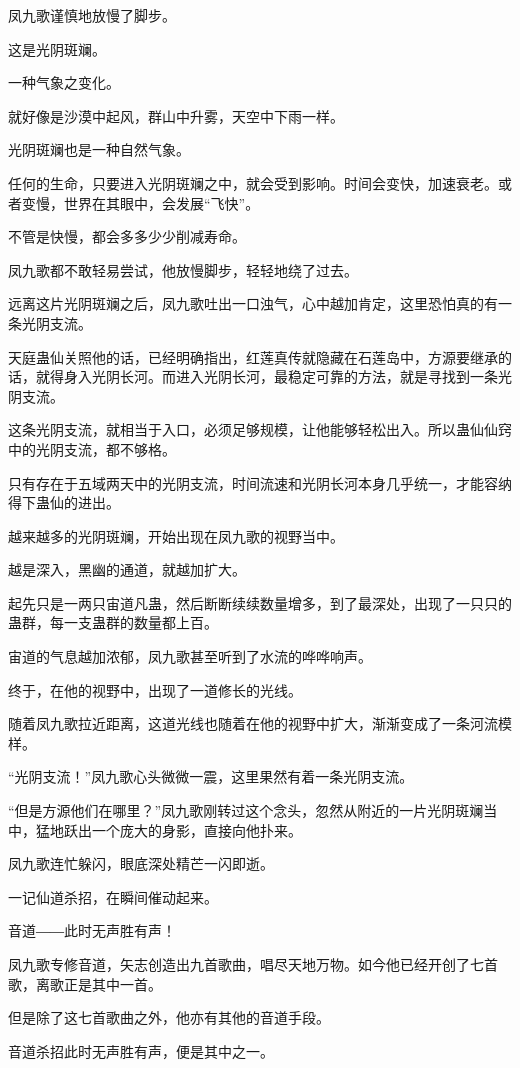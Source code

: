 \begin{this_body}
凤九歌谨慎地放慢了脚步。

这是光阴斑斓。

一种气象之变化。

就好像是沙漠中起风，群山中升雾，天空中下雨一样。

光阴斑斓也是一种自然气象。

任何的生命，只要进入光阴斑斓之中，就会受到影响。时间会变快，加速衰老。或者变慢，世界在其眼中，会发展“飞快”。

不管是快慢，都会多多少少削减寿命。

凤九歌都不敢轻易尝试，他放慢脚步，轻轻地绕了过去。

远离这片光阴斑斓之后，凤九歌吐出一口浊气，心中越加肯定，这里恐怕真的有一条光阴支流。

天庭蛊仙关照他的话，已经明确指出，红莲真传就隐藏在石莲岛中，方源要继承的话，就得身入光阴长河。而进入光阴长河，最稳定可靠的方法，就是寻找到一条光阴支流。

这条光阴支流，就相当于入口，必须足够规模，让他能够轻松出入。所以蛊仙仙窍中的光阴支流，都不够格。

只有存在于五域两天中的光阴支流，时间流速和光阴长河本身几乎统一，才能容纳得下蛊仙的进出。

越来越多的光阴斑斓，开始出现在凤九歌的视野当中。

越是深入，黑幽的通道，就越加扩大。

起先只是一两只宙道凡蛊，然后断断续续数量增多，到了最深处，出现了一只只的蛊群，每一支蛊群的数量都上百。

宙道的气息越加浓郁，凤九歌甚至听到了水流的哗哗响声。

终于，在他的视野中，出现了一道修长的光线。

随着凤九歌拉近距离，这道光线也随着在他的视野中扩大，渐渐变成了一条河流模样。

“光阴支流！”凤九歌心头微微一震，这里果然有着一条光阴支流。

“但是方源他们在哪里？”凤九歌刚转过这个念头，忽然从附近的一片光阴斑斓当中，猛地跃出一个庞大的身影，直接向他扑来。

凤九歌连忙躲闪，眼底深处精芒一闪即逝。

一记仙道杀招，在瞬间催动起来。

音道――此时无声胜有声！

凤九歌专修音道，矢志创造出九首歌曲，唱尽天地万物。如今他已经开创了七首歌，离歌正是其中一首。

但是除了这七首歌曲之外，他亦有其他的音道手段。

音道杀招此时无声胜有声，便是其中之一。


\end{this_body}
